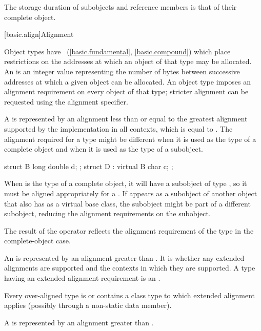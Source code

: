 \pnum
{}%
The storage duration of subobjects and reference members
is that of their complete object.
%

[basic.align]{Alignment}

\pnum
Object types have ~(\ref{basic.fundamental}, \ref{basic.compound})
which place restrictions on the addresses at which an object of that type
may be allocated. An  is an 
integer value representing the number of bytes between successive addresses
at which a given object can be allocated. An object type imposes an alignment
requirement on every object of that type; stricter alignment can be requested
using the alignment specifier.

\pnum
{}%
A  is represented by an alignment
less than or equal to the greatest alignment supported by the implementation in
all contexts, which is equal to
.
The alignment required for a type might be different when it is used as the type
of a complete object and when it is used as the type of a subobject.
\begin{example}
\begin{codeblock}
struct B { long double d; };
struct D : virtual B { char c; };
\end{codeblock}

When  is the type of a complete object, it will have a subobject of
type , so it must be aligned appropriately for a .
If  appears as a subobject of another object that also has 
as a virtual base class, the  subobject might be part of a different
subobject, reducing the alignment requirements on the  subobject.
\end{example}
The result of the  operator reflects the alignment
requirement of the type in the complete-object case.

\pnum
{}%
%
%
An  is represented by an alignment
greater than . It is 
whether any extended alignments are supported and the contexts in which they are
supported. A type having an extended alignment
requirement is an .
\begin{note}
Every over-aligned type is or contains a class type
to which extended alignment applies (possibly through a non-static data member).
\end{note}
A  is represented by
an alignment greater than .

